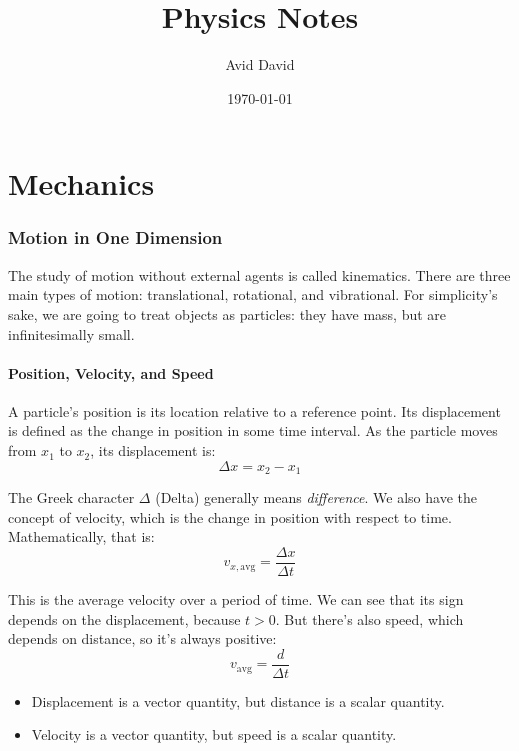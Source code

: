 \documentclass[12pt]{article}
\begin{document}
\title{Physics Notes}
\author{Avid David}
\date{\today}
\maketitle
\tableofcontents
\newpage
\part{Mechanics}
\section{Motion in One Dimension}
The study of motion without external agents is called kinematics. There are three main types of motion: translational, rotational, and vibrational. For simplicity's sake, we are going to treat objects as particles: they have mass, but are infinitesimally small.
\subsection*{Position, Velocity, and Speed}
A particle's position is its location relative to a reference point. Its displacement is defined as the change in position in some time interval. As the particle moves from $x_1$ to $x_2$, its displacement is:
\begin{equation}
    \Delta x = x_2 - x_1
\end{equation}
\par The Greek character $\Delta$ (Delta) generally means \textit{difference}. We also have the concept of velocity, which is the change in position with respect to time. Mathematically, that is:
\begin{equation}
    v_{x,\text{avg}} = \dfrac{\Delta x}{\Delta t}
\end{equation}
\par This is the average velocity over a period of time. We can see that its sign depends on the displacement, because $t > 0$. But there's also speed, which depends on distance, so it's always positive:
\begin{equation}
    v_{\text{avg}} = \dfrac{d}{\Delta t}
\end{equation}
\begin{important}
\begin{itemize}
    \item Displacement is a vector quantity, but distance is a scalar quantity.
    \item Velocity is a vector quantity, but speed is a scalar quantity.
\end{itemize}

\end{important}
\end{document}
